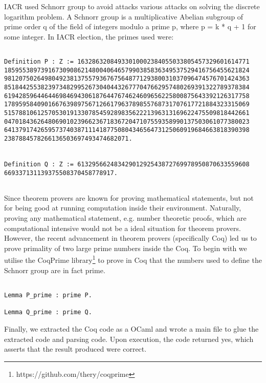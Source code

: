 IACR used Schnorr group to avoid attacks various attacks on solving the discrete 
logarithm problem.  A Schnorr group is a multiplicative Abelian subgroup of prime order q of the field of 
integers modulo a prime p, where p = k * q + 1 for some integer.   In IACR election, 
the primes used were:
\begin{verbatim}

Definition P : Z := 16328632084933010002384055033805457329601614771
1859553897391673090862148004064657990385836349537529416756455621824
9812075026498049238137557936767564877129380031037096474576701424363
8518442553823973482995267304044326777047662957480269391322789378384
6194285964464469846943061876447674624609656225800875643392126317758
1789595840901667639897567126617963789855768731707617721884323315069
5157881061257053019133078545928983562221396313169622475509818442661
0470184362648069010239662367183672047107559358990137503061077380023
6413791742659573740387111418775080434656473125060919684663818390398
2387884578266136503697493474682071.


Definition Q : Z := 61329566248342901292543872769978950870633559608
669337131139375508370458778917.


\end{verbatim}

Since theorem provers are known for proving mathematical statements, but not for being good at running 
computation inside their environment. Naturally, proving any mathematical statement, e.g. number 
theoretic proofs, which are computational intensive would not be a ideal situation for theorem provers. 
However, the recent advancement in theorem provers (specifically Coq) led
us to prove primality of two large prime numbers inside the Coq.
To begin with we utilise the CoqPrime
library\footnote{https://github.com/thery/coqprime} to prove in Coq that the
numbers used to define the Schnorr group are
in fact prime.
\begin{verbatim}

Lemma P_prime : prime P.

Lemma Q_prime : prime Q.

\end{verbatim}


Finally, we extracted the Coq code as a OCaml and wrote a main file to glue the 
extracted code and parsing code. Upon execution, the code returned 
yes, which asserts that the result produced were correct. 


